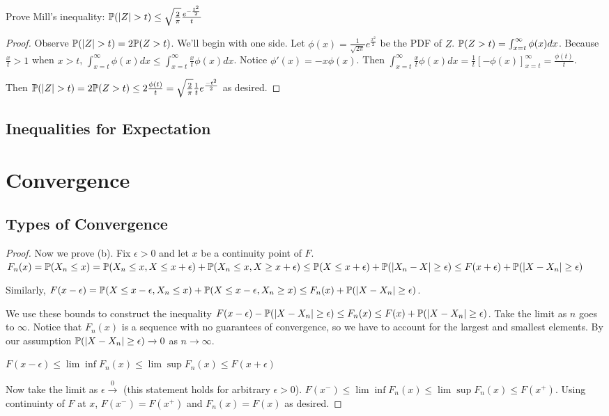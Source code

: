 \documentclass[10pt]{article}
\begin{document}
\begin{exercise}
    Prove Mill's inequality: $\P(|Z| > t) \leq
    \sqrt{\frac{2}{\pi}}\frac{e^{-\frac{t^2}{2}}}{t}$
\end{exercise}

\begin{proof}
    Observe $\P(|Z| > t) = 2\P(Z > t)$. We'll begin with one side. Let $\phi(x)
    = \frac{1}{\sqrt{2\pi}} e^{\frac{x^2}{2}}$ be the PDF of $Z$. $\P(Z > t) =
    \int_{x=t}^{\infty} \phi(x) dx$. Because $\frac{x}{t} > 1$ when $x > t$,
    $\int_{x=t}^{\infty} \phi(x) dx \leq \int_{x=t}^{\infty} \frac{x}{t}
    \phi(x) dx$. Notice $\phi'(x) = -x\phi(x)$. Then $\int_{x=t}^{\infty}
    \frac{x}{t} \phi(x) dx = \frac{1}{t}[-\phi(x)]_{x=t}^{\infty} =
    \frac{\phi(t)}{t}$.

    Then $\P(|Z| > t) = 2\P(Z > t) \leq 2 \frac{\phi(t)}{t} =
    \sqrt{\frac{2}{\pi}} \frac{1}{t} e^{\frac{-t^2}{2}}$ as desired.
\end{proof}

\subsection{Inequalities for Expectation}


\section{Convergence}

\subsection{Types of Convergence}

\begin{proof}

Now we prove (b). Fix $\epsilon > 0$ and let $x$ be a continuity point of $F$. $F_n(x) =
\P(X_n \leq x) = \P(X_n \leq x, X \leq x + \epsilon) + \P(X_n \leq x, X \geq x
+ \epsilon) \leq \P(X \leq x + \epsilon) + \P(|X_n - X| \geq \epsilon) \leq
F(x+\epsilon) + \P(|X - X_n| \geq \epsilon)$

Similarly, $F(x-\epsilon) = \P(X \leq x - \epsilon, X_n \leq x) + \P(X \leq x -
\epsilon, X_n \geq x) \leq F_n(x) + \P(|X-X_n| \geq \epsilon)$.

We use these bounds to construct the inequality $F(x-\epsilon) - \P(|X-X_n|\geq
\epsilon)\leq F_n(x) \leq F(x) + \P(|X-X_n|\geq \epsilon)$. Take the limit as
$n$ goes to $\infty$. Notice that $F_n(x)$ is a sequence with no guarantees of
convergence, so we have to account for the largest and smallest elements. By our assumption $\P(|X-X_n|\geq \epsilon) \xrightarrow{} 0$ as $n \xrightarrow{} \infty$.

$F(x-\epsilon) \leq \lim \inf F_n(x) \leq \lim \sup F_n(x) \leq F(x+\epsilon)$

Now take the limit as $\epsilon \xrightarrow 0$ (this statement holds for
arbitrary $\epsilon > 0$). $F(x^-) \leq \lim \inf F_n(x) \leq \lim \sup F_n(x)
\leq F(x^+)$. Using continuinty of $F$ at $x$, $F(x^-) = F(x^+)$ and $F_n(x) =
F(x)$ as desired.
\end{proof}
\end{document}
